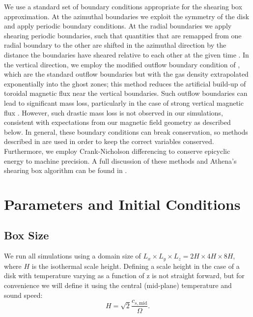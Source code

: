 We use a standard set of boundary conditions appropriate for the shearing box approximation. At the azimuthal boundaries we exploit the symmetry of the disk and apply periodic boundary conditions. At the radial boundaries we  apply shearing periodic boundaries, such that quantities that are remapped from one radial boundary to the other are  shifted in the azimuthal direction by the distance the boundaries have sheared relative to each other at the given time \citep{hawley95}. In the vertical direction, we employ the modified outflow boundary condition of \cite{simon13}, which are the standard outflow boundaries but with the gas density extrapolated exponentially into the ghost zones; this method reduces the artificial build-up of toroidal magnetic flux near the vertical boundaries.  Such outflow boundaries can lead to significant mass loss, particularly in the case of strong vertical magnetic flux \citep{simon13}.  However, such drastic mass loss is not observed in our simulations, consistent with expectations from our magnetic field geometry as described below. In general, these boundary conditions can break conservation, so methods described in \cite{stone10} are used in order to keep the correct variables conserved.   Furthermore, we employ Crank-Nicholson differencing to conserve epicyclic energy to machine precision. A full discussion of these methods and {\sc Athena}'s shearing box algorithm can be found in \cite{stone10}.\\              





\section{Parameters and Initial Conditions} 


\subsection{Box Size}
We run all simulations using a domain size of $L_x \times L_y \times L_z = 2H \times 4H \times 8H$, where $H$ is the isothermal scale height.  Defining a scale height in the case of a disk with temperature varying as a function of z is not straight forward, but for convenience we will define it using the central (mid-plane) temperature and sound speed:
\begin{equation}
H = \sqrt{2} \frac{c_{s, \text{mid}}}{\Omega}.     
\label{eq_H_definition}    
\end{equation}


